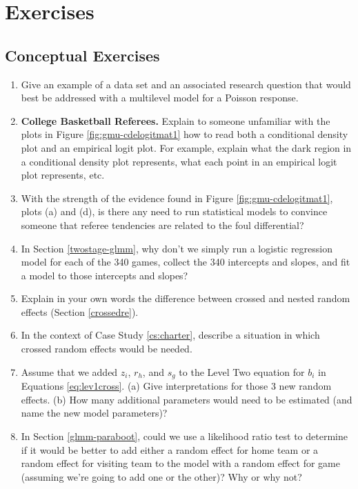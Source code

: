 \documentclass[
]{krantz}
\begin{document}
\hypertarget{exercises-10}{%
\section{Exercises}\label{exercises-10}}

\hypertarget{conceptual-exercises-8}{%
\subsection{Conceptual Exercises}\label{conceptual-exercises-8}}

\begin{enumerate}
\def\labelenumi{\arabic{enumi}.}
\item
  Give an example of a data set and an associated research question that would best be addressed with a multilevel model for a Poisson response.
\item
  \textbf{College Basketball Referees.} Explain to someone unfamiliar with the plots in Figure \ref{fig:gmu-cdelogitmat1} how to read both a conditional density plot and an empirical logit plot. For example, explain what the dark region in a conditional density plot represents, what each point in an empirical logit plot represents, etc.
\item
  With the strength of the evidence found in Figure \ref{fig:gmu-cdelogitmat1}, plots (a) and (d), is there any need to run statistical models to convince someone that referee tendencies are related to the foul differential?
\item
  In Section \ref{twostage-glmm}, why don't we simply run a logistic regression model for each of the 340 games, collect the 340 intercepts and slopes, and fit a model to those intercepts and slopes?
\item
  Explain in your own words the difference between crossed and nested random effects (Section \ref{crossedre}).
\item
  In the context of Case Study \ref{cs:charter}, describe a situation in which crossed random effects would be needed.
\item
  Assume that we added \(z_{i}\), \(r_{h}\), and \(s_{g}\) to the Level Two equation for \(b_{i}\) in Equations \eqref{eq:lev1cross}. (a) Give interpretations for those 3 new random effects. (b) How many additional parameters would need to be estimated (and name the new model parameters)?
\item
  In Section \ref{glmm-paraboot}, could we use a likelihood ratio test to determine if it would be better to add either a random effect for home team or a random effect for visiting team to the model with a random effect for game (assuming we're going to add one or the other)? Why or why not?

\end{enumerate}
\end{document}
